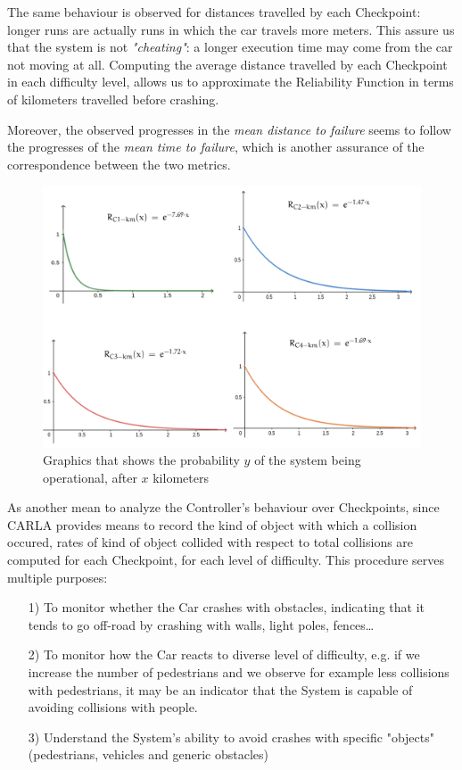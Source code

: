 The same behaviour is observed for distances travelled by each Checkpoint: longer runs are actually runs in which the car travels more meters. This assure us that the system is not \textsl{"cheating"}: a longer execution time may come from the car not moving at all. Computing the average distance travelled by each Checkpoint in each difficulty level, allows us to approximate the Reliability Function in terms of kilometers travelled before crashing.

Moreover, the observed progresses in the \textsl{mean distance to failure} seems to follow the progresses of the \textsl{mean time to failure}, which is another assurance of the correspondence between the two metrics.

\begin{figure}[h!]
	\includegraphics[width=\textwidth]{img/reliability-meters-comparison.png}
	\caption{Graphics that shows the probability $y$ of the system being operational, after $x$ kilometers}
\end{figure}

As another mean to analyze the Controller's behaviour over Checkpoints, since CARLA provides means to record the kind of object with which a collision occured, rates of kind of object collided with respect to total collisions are computed for each Checkpoint, for each level of difficulty.
This procedure serves multiple purposes:

\begin{itemize}
	\item[1)] To monitor whether the Car crashes with obstacles, indicating that it tends to go off-road by crashing with walls, light poles, fences\dots
	\item[2)] To monitor how the Car reacts to diverse level of difficulty, e.g. if we increase the number of pedestrians and we observe for example less collisions with pedestrians, it may be an indicator that the System is capable of avoiding collisions with people.
	\item[3)] Understand the System's ability to avoid crashes with specific "objects" (pedestrians, vehicles and generic obstacles)
\end{itemize}

